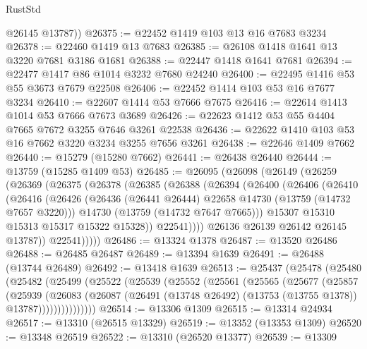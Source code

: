 \begin{lexlean}{RustStd}
\begin{coremodule}
        @26145
        @13787))
@26375 := @22452 @1419 @103 @13 @16 @7683 @3234
@26378 := @22460 @1419 @13 @7683
@26385 := @26108 @1418 @1641 @13 @3220 @7681 @3186 @1681
@26388 := @22447 @1418 @1641 @7681
@26394 := @22477 @1417 @86 @1014 @3232 @7680 @24240
@26400 := @22495 @1416 @53 @55 @3673 @7679 @22508
@26406 := @22452 @1414 @103 @53 @16 @7677 @3234
@26410 := @22607 @1414 @53 @7666 @7675
@26416 := @22614 @1413 @1014 @53 @7666 @7673 @3689
@26426 := @22623 @1412 @53 @55 @4404 @7665 @7672 @3255 @7646 @3261 @22538
@26436 := @22622 @1410 @103 @53 @16 @7662 @3220 @3234 @3255 @7656 @3261
@26438 := @22646 @1409 @7662
@26440 := @15279 (@15280 @7662)
@26441 := @26438 @26440
@26444 := @13759 (@15285 @1409 @53)
@26485 := @26095
    (@26098
      (@26149
        (@26259
          (@26369
            (@26375
              (@26378
                (@26385
                  (@26388
                    (@26394
                      (@26400
                        (@26406
                          (@26410
                            (@26416
                              (@26426
                                (@26436 (@26441 @26444) @22658 @14730 (@13759 (@14732 @7657 @3220)))
                                @14730
                                (@13759 (@14732 @7647 @7665)))
                              @15307
                              @15310
                              @15313
                              @15317
                              @15322
                              @15328))
                          @22541))))
                  @26136
                  @26139
                  @26142
                  @26145
                  @13787))
              @22541)))))
@26486 := @13324 @1378
@26487 := @13520 @26486
@26488 := @26485 @26487
@26489 := @13394 @1639
@26491 := @26488 (@13744 @26489)
@26492 := @13418 @1639
@26513 := @25437
    (@25478
      (@25480
        (@25482
          (@25499
            (@25522
              (@25539
                (@25552
                  (@25561
                    (@25565
                      (@25677
                        (@25857
                          (@25939
                            (@26083
                              (@26087
                                (@26491
                                  (@13748 @26492)
                                  (@13753 (@13755 @1378))
                                  @13787)))))))))))))))
@26514 := @13306 @1309
@26515 := @13314 @24934
@26517 := @13310 (@26515 @13329)
@26519 := @13352 (@13353 @1309)
@26520 := @13348 @26519
@26522 := @13310 (@26520 @13377)
@26539 := @13309

\end{coremodule}
\end{lexlean}
